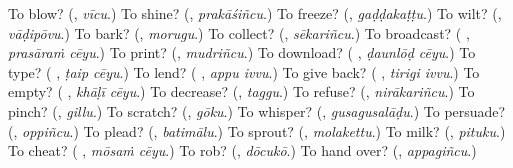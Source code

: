 \begin{tcolorbox}[breakable,colback=teal!4,colframe=teal!35!black,title={Before you move on}]
To blow? (\textbf{}, \emph{vīcu}.) To shine? (\textbf{}, \emph{prakāśiñcu}.) To freeze? (\textbf{}, \emph{gaḍḍakaṭṭu}.) To wilt? (\textbf{}, \emph{vāḍipōvu}.) To bark? (\textbf{}, \emph{morugu}.) To collect? (\textbf{}, \emph{sēkariñcu}.) To broadcast? (\textbf{ }, \emph{prasāraṁ cēyu}.) To print? (\textbf{}, \emph{mudriñcu}.) To download? (\textbf{ }, \emph{ḍaunlōḍ cēyu}.) To type? (\textbf{ }, \emph{ṭaip cēyu}.) To lend? (\textbf{ }, \emph{appu ivvu}.) To give back? (\textbf{ }, \emph{tirigi ivvu}.) To empty? (\textbf{ }, \emph{khāḷī cēyu}.) To decrease? (\textbf{}, \emph{taggu}.) To refuse? (\textbf{}, \emph{nirākariñcu}.) To pinch? (\textbf{}, \emph{gillu}.) To scratch? (\textbf{}, \emph{gōku}.) To whisper? (\textbf{}, \emph{gusagusalāḍu}.) To persuade? (\textbf{}, \emph{oppiñcu}.) To plead? (\textbf{}, \emph{batimālu}.) To sprout? (\textbf{}, \emph{molakettu}.) To milk? (\textbf{}, \emph{pituku}.) To cheat? (\textbf{ }, \emph{mōsaṁ cēyu}.) To rob? (\textbf{}, \emph{dōcukō}.) To hand over? (\textbf{}, \emph{appagiñcu}.)
\end{tcolorbox}

